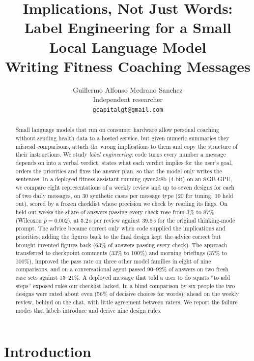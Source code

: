 \documentclass[10pt,twocolumn]{article}
\title{Implications, Not Just Words: Label Engineering for a Small Local Language Model\\Writing Fitness Coaching Messages}
\author{Guillermo Alfonso Medrano Sanchez\\Independent researcher\\\texttt{gcapitalgt@gmail.com}}
\date{}
\begin{document}
\maketitle

\begin{abstract}
Small language models that run on consumer hardware allow personal coaching without sending health data to a hosted
service, but given numeric summaries they misread comparisons, attach the wrong implications to them and copy the
structure of their instructions. We study \emph{label engineering}: code turns every number a message depends on into
a verbal verdict, states what each verdict implies for the user's goal, orders the priorities and fixes the answer
plan, so that the model only writes the sentences. In a deployed fitness assistant running qwen3:8b (4-bit) on an
8\,GB GPU, we compare eight representations of a weekly review and up to seven designs for each of two daily messages,
on 30 synthetic cases per message type (20 for tuning, 10 held out), scored by a frozen checklist whose precision we
check by reading its flags. On held-out weeks the share of answers passing every check rose from 3\% to 87\%
(Wilcoxon $p=0.002$), at 5.2\,s per review against 39.6\,s for the original thinking-mode prompt. The advice became
correct only when code supplied the implications and priorities; adding the figures back to the final design kept the
advice correct but brought invented figures back (63\% of answers passing every check). The approach transferred to checkpoint comments (33\% to 100\%) and
morning briefings (37\% to 100\%), improved the pass rate on three other model families in eight of nine comparisons,
and on a conversational agent passed 90--92\% of answers on two fresh case sets against 15--21\%. A deployed message
that told a user to do squats ``to add steps'' exposed rules our checklist lacked. In a blind comparison by six people
the two designs were rated about even (56\% of decisive choices for words): ahead on the weekly review, behind on the
chat, with little agreement between raters. We report the failure modes that labels introduce and derive nine design
rules.
\end{abstract}

\section{Introduction}
\label{sec:intro}
\end{document}
